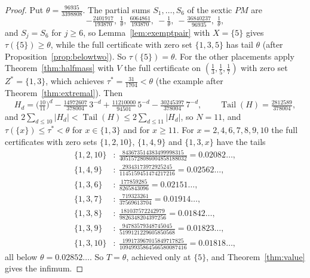 \documentclass[11pt]{article}
\theoremstyle{definition}
\theoremstyle{plain}
\DeclareMathOperator{\Tail}{Tail}
\begin{document}
\begin{proof}
Put $\theta=\tfrac{96935}{3398808}$.  The partial sums $S_1,\ldots,S_6$ of
the sextic $PM$ are
\[
  -\tfrac{2401917}{193870},\ \tfrac1\theta,\ \tfrac{6064861}{193870},\
  -\tfrac1\theta,\ -\tfrac{36840237}{96935},\ \tfrac1\theta,
\]
and $S_j=S_6$ for $j\ge6$, so Lemma~\ref{lem:exemptpair} with $X=\{5\}$ gives
$\tau(\{5\})\ge\theta$, while the full certificate with zero set
$\{1,3,5\}$ has tail $\theta$ (after Proposition~\ref{prop:belowtwo}).  So
$\tau(\{5\})=\theta$.  For the other placements apply
Theorem~\ref{thm:halfmass} with $V$ the full certificate on
$(\tfrac13,\tfrac15,\tfrac17)$ with zero set $Z^*=\{1,3\}$, which achieves
$\tau^*=\tfrac{31}{1704}<\theta$ (the example after
Theorem~\ref{thm:extremal}).  Then
\[
  H_d=\bigl(\tfrac{10}{11}\bigr)^d-\tfrac{14972607}{378004}\,3^{-d}
  +\tfrac{11210000}{94501}\,5^{-d}-\tfrac{30245397}{378004}\,7^{-d},
  \qquad \Tail(H)=\tfrac{2812589}{378004},
\]
and $2\sum_{d\le10}|H_d|<\Tail(H)\le2\sum_{d\le11}|H_d|$, so $N=11$, and
$\tau(\{x\})\le\tau^*<\theta$ for $x\in\{1,3\}$ and for $x\ge11$.  For
$x=2,4,6,7,8,9,10$ the full certificates with zero sets $\{1,2,10\}$,
$\{1,4,9\}$ and $\{1,3,x\}$ have the tails
\begin{align*}
  \{1,2,10\}&:\ \tfrac{843673514383499998315}{40515728086004858188032}=0.02082\ldots,\\
  \{1,4,9\}&:\ \tfrac{29343173972925245}{1145159451474217216}=0.02562\ldots,\\
  \{1,3,6\}&:\ \tfrac{177859285}{8265843096}=0.02151\ldots,\\
  \{1,3,7\}&:\ \tfrac{719323261}{37569613704}=0.01914\ldots,\\
  \{1,3,8\}&:\ \tfrac{181037572242979}{9826348204397256}=0.01842\ldots,\\
  \{1,3,9\}&:\ \tfrac{94783579348745045}{5199121229605850568}=0.01823\ldots,\\
  \{1,3,10\}&:\ \tfrac{199173967015849717825}{10949935864566580087416}=0.01818\ldots,
\end{align*}
all below $\theta=0.02852\ldots$.  So $T=\theta$, achieved
only at $\{5\}$, and Theorem~\ref{thm:value} gives the infimum.


\end{proof}
\end{document}
